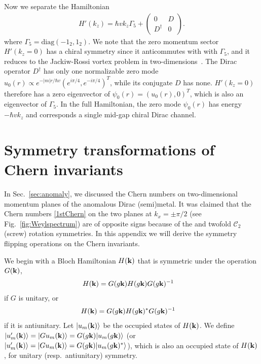 Now we separate the Hamiltonian \begin{align}H'(k_z)=\hbar vk_z\Gamma_5+\left(\begin{smallmatrix}0&D\\D^\dagger&0\end{smallmatrix}\right).\end{align} where $\Gamma_5=\mathrm{diag}(-1_2,1_2)$. We note that the zero momentum sector $H'(k_z=0)$ has a chiral symmetry since it anticommutes with with $\Gamma_5$, and it reduces to the Jackiw-Rossi vortex problem in two-dimensions~\cite{JackiwRossi81}. The Dirac operator $D^\dagger$ has only one normalizable zero mode $u_0(r)\propto e^{-|m|r/\hbar v}(e^{i\pi/4}, e^{-i\pi/4})^T$, while its conjugate $D$ has none. $H'(k_z=0)$ therefore has a zero eigenvector of $\psi_0(r)=(u_0(r),0)^T$, which is also an eigenvector of $\Gamma_5$. In the full Hamiltonian, the zero mode $\psi_0(r)$ has energy $-\hbar vk_z$ and corresponds a single mid-gap chiral Dirac channel.

\chapter{Symmetry transformations of Chern invariants}\label{sec:Chernapp}

In Sec.~\ref{sec:anomaly}, we discussed the Chern numbers on two-dimensional momentum planes of the anomalous Dirac (semi)metal. It was claimed that the Chern numbers \eqref{1stChern} on the two planes at $k_x=\pm\pi/2$ (see Fig.~\ref{fig:Weylspectrum}) are of opposite signs because of the \AFTR and twofold $\mathcal{C}_2$ (screw) rotation symmetries. In this appendix we will derive the symmetry flipping operations on the Chern invariants.

We begin with a Bloch Hamiltonian $H({\bf k})$ that is symmetric under the operation $G({\bf k})$, \begin{align}H({\bf k})&=G(g{\bf k})H(g{\bf k})G(g{\bf k})^{-1}\end{align} if $G$ is unitary, or \begin{align}H({\bf k})&=G(g{\bf k})H(g{\bf k})^\ast G(g{\bf k})^{-1}\end{align} if it is antiunitary. Let $|u_m({\bf k})\rangle$ be the occupied states of $H({\bf k})$. We define $|u'_m({\bf k})\rangle=|Gu_m({\bf k})\rangle=G(g{\bf k})|u_m(g{\bf k})\rangle$ (or $|u'_m({\bf k})\rangle=|Gu_m({\bf k})\rangle=G(g{\bf k})|u_m(g{\bf k})^\ast\rangle$), which is also an occupied state of $H({\bf k})$, for unitary (resp.~antiunitary) symmetry.

